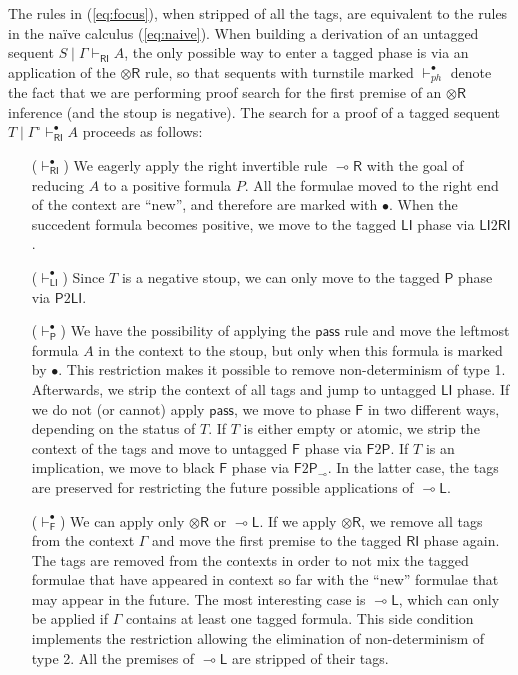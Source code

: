 \documentclass[submission,copyright,creativecommons]{eptcs}
\theoremstyle{definition}
\newcommand{\tl}{\otimes \mathsf{L}}
\newcommand{\tr}{\otimes \mathsf{R}}
\newcommand{\lright}{{\multimap}\mathsf{R}}
\newcommand{\lleft}{{\multimap}\mathsf{L}}
\newcommand{\pass}{\mathsf{pass}}
\newcommand{\unitl}{\mathsf{IL}}
\newcommand{\lolli}{\multimap}
\newcommand{\RI}{\mathsf{RI}}
\newcommand{\LI}{\mathsf{LI}}
\newcommand{\Pass}{\mathsf{P}}
\newcommand{\F}{\mathsf{F}}
\begin{document}
The rules in (\ref{eq:focus}), when stripped of all the tags, are equivalent to the rules in the na{\"i}ve calculus (\ref{eq:naive}). When building a derivation of an untagged sequent $S \mid \Gamma \vdash_\RI A$, the only possible way to enter a tagged phase is via an application of the $\tr$ rule, so that sequents with turnstile marked $\vdash_{ph}^\bullet$ denote the fact that we are performing proof search for the first premise of an $\tr$ inference (and the stoup is negative).
The search for a proof of a tagged sequent $T \mid \Gamma^\circ \vdash^\bullet_\RI A$ proceeds as follows:
\begin{itemize}
\item[($\vdash^\bullet_\RI$)] We eagerly apply the right invertible rule $\lright$ with the goal of reducing $A$ to a positive formula $P$. All the formulae moved to the right end of the context are ``new'', and therefore are marked with $\bullet$.
  When the succedent formula becomes positive, we move to the tagged $\LI$ phase via $\LI2\RI$.
\item[($\vdash^\bullet_\LI$)] Since $T$ is a negative stoup, we can only move to the tagged $\Pass$ phase via $\Pass2\LI$.
\item[($\vdash^\bullet_\Pass$)] We have the possibility of applying the $\pass$ rule and move the leftmost formula $A$ in the context to the stoup, but only when this formula is marked by $\bullet$. This restriction makes it possible to remove non-determinism of type 1. Afterwards, we strip the context of all tags and jump to untagged $\LI$ phase. If we do not (or cannot) apply $\pass$, we move to phase $\F$  in two different ways, depending on the status of $T$. If $T$ is either empty or atomic, we strip the context of the tags and move to untagged $\F$ phase via $\F2\Pass$. If $T$ is an implication, we move to black $\F$ phase via $\F2\Pass_\lolli$. In the latter case, the tags are preserved for restricting the future possible applications of $\lleft$.
\item[($\vdash^\bullet_\F$)] We can apply only $\tr$ or $\lleft$. If we apply $\tr$, we remove all tags from the context $\Gamma$ and move the first premise to the tagged $\RI$ phase again. The tags are removed from the contexts in order to not mix the tagged formulae that have appeared in context so far with the ``new'' formulae that may appear in the future. The most interesting case is $\lleft$, which can only be applied if $\Gamma$ contains at least one tagged formula. This side condition implements the restriction allowing the elimination of non-determinism of type 2. All the premises of $\lleft$ are stripped of their tags.
\end{itemize}
\end{document}
